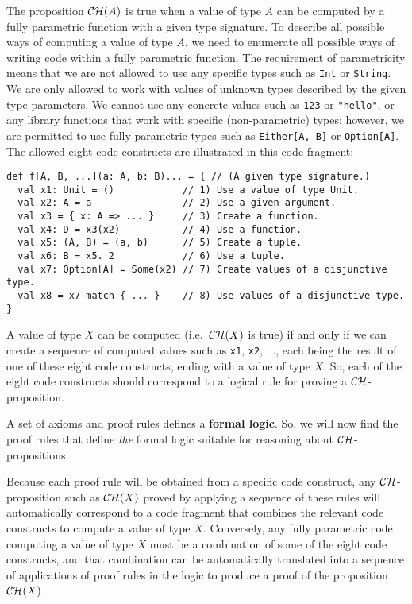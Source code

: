 The proposition ${\cal CH}(A)$ is true when a value of type $A$
can be computed by a fully parametric function with a given type signature.
To describe all possible ways of computing a value of type $A$, we
need to enumerate all possible ways of writing code within a fully
parametric function. The requirement of parametricity means that we
are not allowed to use any specific types such as \lstinline!Int!
or \lstinline!String!. We are only allowed to work with values of
unknown types described by the given type parameters. We cannot use
any concrete values such as \lstinline!123! or \lstinline!"hello"!,
or any library functions that work with specific (non-parametric)
types; however, we are permitted to use fully parametric types such
as \lstinline!Either[A, B]! or \lstinline!Option[A]!. The allowed
eight code constructs are illustrated
in this code fragment:
\begin{lstlisting}
def f[A, B, ...](a: A, b: B)... = { // (A given type signature.)
  val x1: Unit = ()            // 1) Use a value of type Unit.
  val x2: A = a                // 2) Use a given argument.
  val x3 = { x: A => ... }     // 3) Create a function.
  val x4: D = x3(x2)           // 4) Use a function.
  val x5: (A, B) = (a, b)      // 5) Create a tuple.
  val x6: B = x5._2            // 6) Use a tuple.
  val x7: Option[A] = Some(x2) // 7) Create values of a disjunctive type.
  val x8 = x7 match { ... }    // 8) Use values of a disjunctive type.
}
\end{lstlisting}
A value of type $X$ can be computed (i.e.~${\cal CH}(X)$ is true)
if and only if we can create a sequence of computed values such as
\lstinline!x1!, \lstinline!x2!, ..., each being the result of one
of these eight code constructs, ending with a value of type $X$.
So, each of the eight code constructs should correspond to a logical
rule for proving a ${\cal CH}$-proposition.

A set of axioms and proof rules defines a \textbf{formal logic}.
So, we will now find the proof rules that define \emph{the} formal
logic suitable for reasoning about ${\cal CH}$-propositions.

Because each proof rule will be obtained from a specific code construct,
any ${\cal CH}$-proposition such as ${\cal CH}(X)$ proved by applying
a sequence of these rules will automatically correspond to a code
fragment that combines the relevant code constructs to compute a value
of type $X$. Conversely, any fully parametric code computing a value
of type $X$ must be a combination of some of the eight code constructs,
and that combination can be automatically translated into a sequence
of applications of proof rules in the logic to produce a proof of
the proposition ${\cal CH}(X)$.

